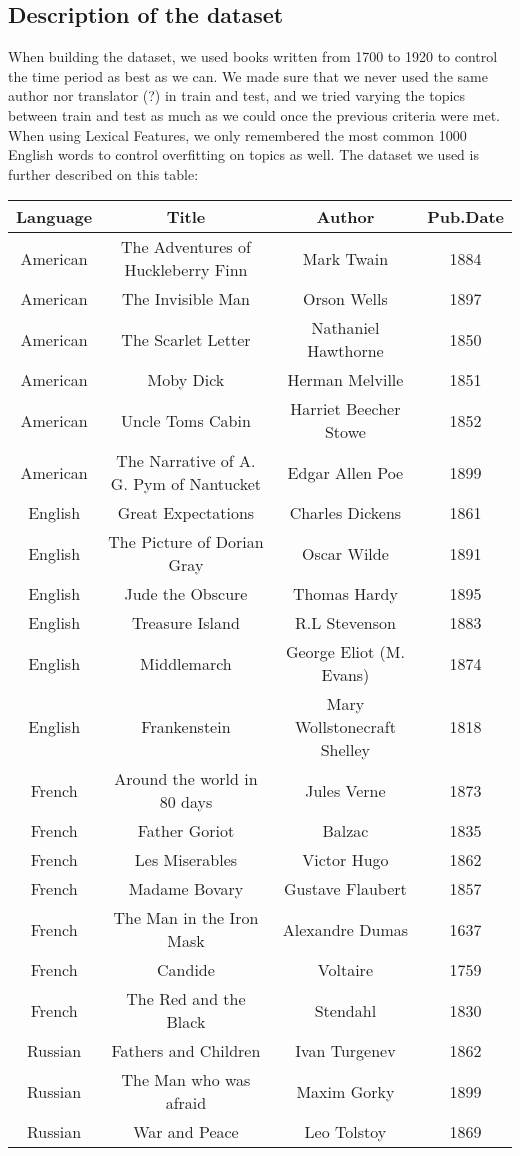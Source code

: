 \documentclass[10pt]{article}
\begin{document}
\subsection{Description of the dataset}
When building the dataset, we used books written from 1700 to 1920 to control the time period as best as we can. We made sure that we never used the same author nor translator (?) in train and test, and we tried varying the topics between train and test as much as we could once the previous criteria were met. When using Lexical Features, we only remembered the most common 1000 English words to control overfitting on topics as well.
The dataset we used is further described on this table:



\begin{tabular}{|c|c|c|c|}
\hline 
Language & Title & Author & Pub.Date\tabularnewline
\hline 
\hline 
American & The Adventures of Huckleberry Finn & Mark Twain & 1884\tabularnewline
\hline 
American & The Invisible Man  & Orson Wells & 1897\tabularnewline
\hline 
American & The Scarlet Letter & Nathaniel Hawthorne & 1850\tabularnewline
\hline 
American & Moby Dick & Herman Melville & 1851\tabularnewline
\hline 
American & Uncle Toms Cabin & Harriet Beecher Stowe & 1852\tabularnewline
\hline 
American & The Narrative of A. G. Pym of Nantucket & Edgar Allen Poe & 1899\tabularnewline
\hline 
\hline 
English & Great Expectations & Charles Dickens & 1861\tabularnewline
\hline 
English & The Picture of Dorian Gray & Oscar Wilde & 1891\tabularnewline
\hline 
English & Jude the Obscure & Thomas Hardy & 1895\tabularnewline
\hline 
English & Treasure Island & R.L Stevenson & 1883\tabularnewline
\hline 
English & Middlemarch & George Eliot (M. Evans) & 1874\tabularnewline
\hline 
English & Frankenstein & Mary Wollstonecraft Shelley & 1818\tabularnewline
\hline
\hline  
French & Around the world in 80 days & Jules Verne  & 1873\tabularnewline
\hline 
French & Father Goriot  & Balzac & 1835\tabularnewline
\hline 
French & Les Miserables  & Victor Hugo & 1862\tabularnewline
\hline 
French & Madame Bovary & Gustave Flaubert  & 1857\tabularnewline
\hline 
French & The Man in the Iron Mask & Alexandre Dumas & 1637\tabularnewline
\hline 
French & Candide & Voltaire & 1759\tabularnewline
\hline 
French & The Red and the Black & Stendahl & 1830\tabularnewline
\hline 
\hline 
Russian & Fathers and Children  & Ivan Turgenev  & 1862\tabularnewline
\hline 
Russian & The Man who was afraid  & Maxim Gorky  & 1899\tabularnewline
\hline 
Russian & War and Peace & Leo Tolstoy & 1869\tabularnewline

\end{tabular}
\end{document}
